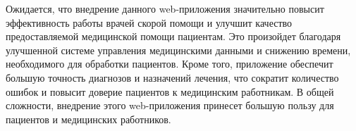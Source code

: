 Ожидается, что внедрение данного web-приложения значительно повысит эффективность работы врачей скорой помощи и улучшит качество предоставляемой медицинской помощи пациентам. Это произойдет благодаря улучшенной системе управления медицинскими данными и снижению времени, необходимого для обработки пациентов. Кроме того, приложение обеспечит большую точность диагнозов и назначений лечения, что сократит количество ошибок и повысит доверие пациентов к медицинским работникам. В общей сложности, внедрение этого web-приложения принесет большую пользу для пациентов и медицинских работников.
